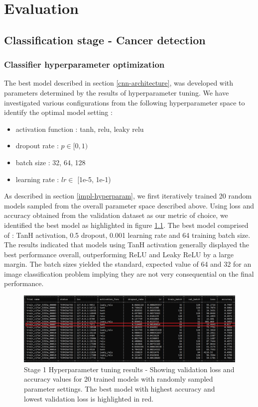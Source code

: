 \documentclass{l4proj}
\begin{document}
\chapter{Evaluation} 
\section{Classification stage - Cancer detection}
\subsection{Classifier hyperparameter optimization}
The best model described in section \ref{cnn-architecture}, was developed with parameters determined by the results of hyperparameter tuning. We have investigated various configurations from the following hyperparameter space to identify the optimal model setting :
\begin{itemize}
    \item  activation function : tanh, relu, leaky relu
    \item dropout rate : \(p \in [0, 1)\)
    \item batch size : 32, 64, 128
    \item learning rate : \(lr \in \) [1e-5, 1e-1)
\end{itemize}

As described in section \ref{impl-hyperparam}, we first iteratively trained 20 random models sampled from the overall parameter space described above. Using loss and accuracy obtained from the validation dataset as our metric of choice, we identified the best model as highlighted in figure \ref{fig:tuning-stage-1}. The best model comprised of : TanH activation, 0.5 dropout, 0.001 learning rate and 64 training batch size. The results indicated that models using TanH activation generally displayed the best performance overall, outperforming ReLU and Leaky ReLU by a large margin. The batch sizes yielded the standard, expected value of 64 and 32 for an image classification problem implying they are not very consequential on the final performance. 

\begin{figure}[h]
    \centering
    \includegraphics[scale=0.4]{images/tuning-stage1.png}
    \caption{Stage 1 Hyperparameter tuning results - Showing validation loss and accuracy values for 20 trained models with randomly sampled parameter settings. The best model with highest accuracy and lowest validation loss is highlighted in red. }
    \label{fig:tuning-stage-1}
\end{figure}
\end{document}
